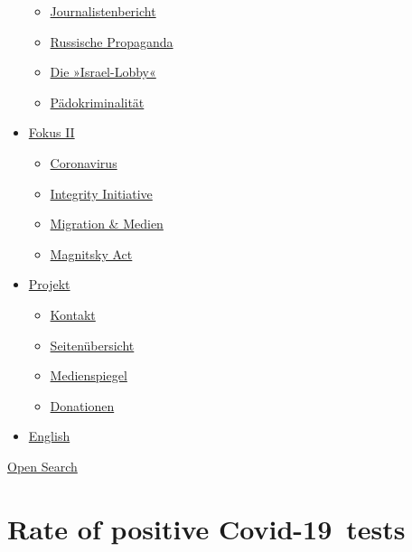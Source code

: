 \begin{itemize}
  \begin{itemize}
  \tightlist
  \item
    \href{https://swprs.org/bericht-eines-journalisten/}{Journalistenbericht}
  \item
    \href{https://swprs.org/russische-propaganda/}{Russische Propaganda}
  \item
    \href{https://swprs.org/die-israel-lobby-fakten-und-mythen/}{Die
    »Israel-Lobby«}
  \item
    \href{https://swprs.org/geopolitik-und-paedokriminalitaet/}{Pädokriminalität}
  \end{itemize}
\item
  \href{https://swprs.org/migration-und-medien/}{Fokus II}

  \begin{itemize}
  \tightlist
  \item
    \href{https://swprs.org/covid-19-hinweis-ii/}{Coronavirus}
  \item
    \href{https://swprs.org/die-integrity-initiative/}{Integrity
    Initiative}
  \item
    \href{https://swprs.org/migration-und-medien/}{Migration \& Medien}
  \item
    \href{https://swprs.org/der-fall-magnitsky/}{Magnitsky Act}
  \end{itemize}
\item
  \href{https://swprs.org/kontakt/}{Projekt}

  \begin{itemize}
  \tightlist
  \item
    \href{https://swprs.org/kontakt/}{Kontakt}
  \item
    \href{https://swprs.org/uebersicht/}{Seitenübersicht}
  \item
    \href{https://swprs.org/medienspiegel/}{Medienspiegel}
  \item
    \href{https://swprs.org/donationen/}{Donationen}
  \end{itemize}
\item
  \href{https://swprs.org/contact/}{English}
\end{itemize}

\protect\hyperlink{}{Open Search}

\hypertarget{rate-of-positive-covid-19-tests}{%
\section{Rate of positive
Covid-19~tests}\label{rate-of-positive-covid-19-tests}}

